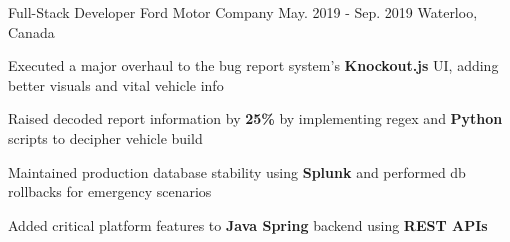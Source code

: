 \begin{cventries}
  \cventry
    {Full-Stack Developer} %
    {Ford Motor Company} %
    {May. 2019 - Sep. 2019} %
    {Waterloo, Canada} %
    {
      \begin{cvitems} %
        \item Executed a major overhaul to the bug report system's \textbf{Knockout.js} UI, adding better visuals and vital vehicle info
        \item Raised decoded report information by \textbf{25\%} by implementing regex and \textbf{Python} scripts to decipher vehicle build
        \item Maintained production database stability using \textbf{Splunk} and performed db rollbacks for emergency scenarios
        \item Added critical platform features to \textbf{Java Spring} backend using \textbf{REST APIs}
      \end{cvitems}
    }

\end{cventries}
